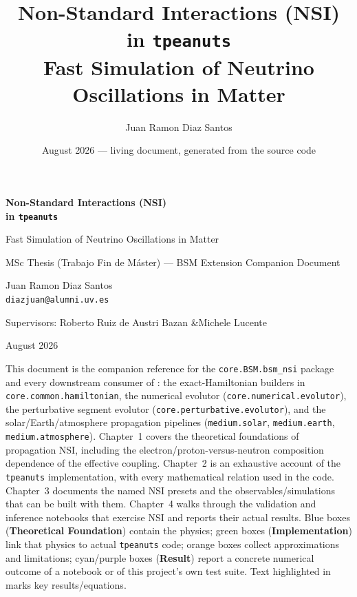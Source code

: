 \documentclass[11pt,a4paper,openany]{report}
\title{\Huge Non-Standard Interactions (NSI) in \texttt{tpeanuts}\\[4pt]
  \Large Fast Simulation of Neutrino Oscillations in Matter}
\author{Juan Ramon Diaz Santos}
\date{August 2026 --- living document, generated from the source code}
\begin{document}
\begin{titlepage}
  \centering
  \vspace*{1.6cm}
  {\Huge\bfseries\color{nsiColor} Non-Standard Interactions (NSI)\\[4pt] in \texttt{tpeanuts}\par}
  \vspace{0.8cm}
  {\Large Fast Simulation of Neutrino Oscillations in Matter\par}
  \vspace{1.5cm}
  {\large MSc Thesis (Trabajo Fin de M\'aster) --- BSM Extension Companion Document\par}
  \vspace{0.3cm}
  {\large Juan Ramon Diaz Santos \\ \texttt{diazjuan@alumni.uv.es}\par}
  \vspace{0.6cm}
  {\normalsize Supervisors: Roberto Ruiz de Austri Bazan \quad\&\quad Michele Lucente\par}
  \vfill
  {\normalsize August 2026\par}
  \vspace{0.5cm}
  \begin{tcolorbox}[colback=nsiColor!5,colframe=nsiColor,width=0.85\textwidth,sharp corners=all,rounded corners=all,arc=1mm]
    \small
    This document is the companion reference for the \texttt{core.BSM.bsm\_nsi} package and every
    downstream consumer of : the exact-Hamiltonian builders in
    \texttt{core.common.hamiltonian}, the numerical evolutor
    (\texttt{core.numerical.evolutor}), the perturbative segment evolutor
    (\texttt{core.perturbative.evolutor}), and the solar/Earth/atmosphere propagation pipelines
    (\texttt{medium.solar}, \texttt{medium.earth}, \texttt{medium.atmosphere}). Chapter~1 covers
    the theoretical foundations of propagation NSI, including the electron/proton-versus-neutron
    composition dependence of the effective coupling. Chapter~2 is an exhaustive account of the
    \texttt{tpeanuts} implementation, with every mathematical relation used in the code. Chapter~3
    documents the named NSI presets and the observables/simulations that can be built with them.
    Chapter~4 walks through the validation and inference notebooks that exercise NSI and reports
    their actual results. Blue boxes (\textbf{Theoretical Foundation}) contain the physics; green
    boxes (\textbf{Implementation}) link that physics to actual \texttt{tpeanuts} code; orange
    boxes collect approximations and limitations; cyan/purple boxes (\textbf{Result}) report a
    concrete numerical outcome of a notebook or of this project's own test suite. Text highlighted
    in  marks key results/equations.
  \end{tcolorbox}
\end{titlepage}
\end{document}
